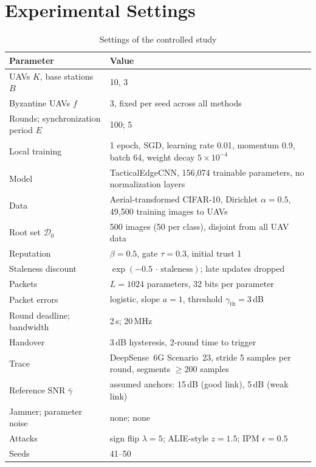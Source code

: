\clearpage
{}
\chapter*{Experimental Settings}
\setcounter{table}{0}
\label{app:settings}

\begin{table}[ht]
\centering
\caption{Settings of the controlled study}
\label{tab:settings}
\begin{tabularx}{\textwidth}{@{}l X@{}}
\toprule
Parameter & Value \\
\midrule
UAVs $K$, base stations $B$ & 10, 3 \\
Byzantine UAVs $f$ & 3, fixed per seed across all methods \\
Rounds; synchronization period $E$ & 100; 5 \\
Local training & 1 epoch, SGD, learning rate 0.01, momentum 0.9, batch 64, weight decay $5\times10^{-4}$ \\
Model & TacticalEdgeCNN, 156{,}074 trainable parameters, no normalization layers \\
Data & Aerial-transformed CIFAR-10, Dirichlet $\alpha=0.5$, 49{,}500 training images to UAVs \\
Root set $\mathcal{D}_0$ & 500 images (50 per class), disjoint from all UAV data \\
Reputation & $\beta=0.5$, gate $\tau=0.3$, initial trust 1 \\
Staleness discount & $\exp(-0.5\,\cdot\,\text{staleness})$; late updates dropped \\
Packets & $L=1024$ parameters, 32 bits per parameter \\
Packet errors & logistic, slope $a=1$, threshold $\gamma_{\mathrm{th}}=3$\,dB \\
Round deadline; bandwidth & 2\,s; 20\,MHz \\
Handover & 3\,dB hysteresis, 2-round time to trigger \\
Trace & DeepSense~6G Scenario~23, stride 5 samples per round, segments $\ge 200$ samples \\
Reference SNR $\bar\gamma$ & assumed anchors: 15\,dB (good link), 5\,dB (weak link) \\
Jammer; parameter noise & none; none \\
Attacks & sign flip $\lambda=5$; ALIE-style $z=1.5$; IPM $\epsilon=0.5$ \\
Seeds & 41--50 \\
\bottomrule
\end{tabularx}
\end{table}

